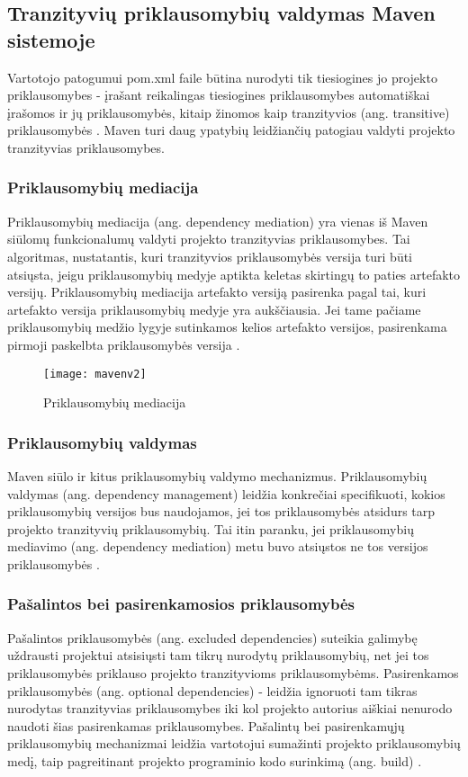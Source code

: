 \subsection{Tranzityvių priklausomybių valdymas Maven sistemoje}

Vartotojo patogumui pom.xml faile būtina nurodyti tik tiesiogines jo projekto priklausomybes -
įrašant reikalingas tiesiogines priklausomybes automatiškai įrašomos ir jų priklausomybės, kitaip žinomos
kaip tranzityvios (ang. transitive) priklausomybės \cite{MAVENd}. Maven turi daug ypatybių leidžiančių patogiau valdyti
projekto tranzityvias priklausomybes.

\subsubsection{Priklausomybių mediacija}
Priklausomybių mediacija (ang. dependency mediation) yra vienas iš Maven siūlomų
funkcionalumų valdyti projekto tranzityvias priklausomybes. Tai algoritmas, nustatantis, kuri
tranzityvios priklausomybės versija turi būti atsiųsta, jeigu priklausomybių medyje aptikta keletas skirtingų
to paties artefakto versijų. Priklausomybių mediacija artefakto versiją pasirenka pagal tai, kuri artefakto
versija priklausomybių medyje yra aukščiausia. Jei tame pačiame priklausomybių medžio lygyje sutinkamos kelios
artefakto versijos, pasirenkama pirmoji paskelbta priklausomybės versija \cite{MAVENd}.

\begin{figure}[H]
    \centering
    \texttt{[image: mavenv2]}
    \caption{Priklausomybių mediacija}
\end{figure}

\subsubsection{Priklausomybių valdymas}
Maven siūlo ir kitus priklausomybių valdymo mechanizmus. Priklausomybių valdymas (ang. dependency management)
leidžia konkrečiai specifikuoti, kokios priklausomybių versijos bus naudojamos, jei
tos priklausomybės atsidurs tarp projekto tranzityvių priklausomybių. Tai itin paranku, jei priklausomybių
mediavimo (ang. dependency mediation) metu buvo atsiųstos ne tos versijos priklausomybės \cite{MAVENd}.

\subsubsection{Pašalintos bei pasirenkamosios priklausomybės}
Pašalintos priklausomybės (ang. excluded dependencies) suteikia galimybę uždrausti
projektui atsisiųsti tam tikrų nurodytų priklausomybių, net jei tos priklausomybės
priklauso projekto tranzityvioms priklausomybėms. Pasirenkamos priklausomybės (ang. optional dependencies) - leidžia
ignoruoti tam tikras nurodytas tranzityvias priklausomybes iki kol projekto autorius aiškiai nenurodo naudoti
šias pasirenkamas priklausomybes. Pašalintų bei pasirenkamųjų priklausomybių mechanizmai leidžia
vartotojui sumažinti projekto priklausomybių medį, taip pagreitinant projekto programinio kodo surinkimą (ang. build) \cite{MAVENd}.